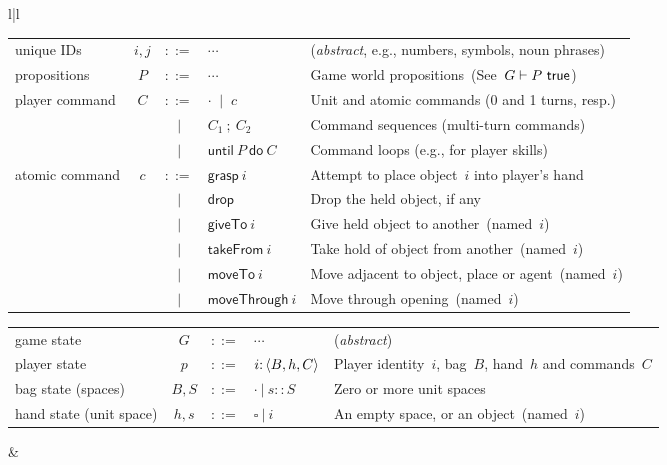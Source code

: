 {\begin{figure*}
\begin{tabular}{l|l}
\begin{minipage}{0.68\textwidth}
\begin{tabular}{lccll}
unique IDs & $i,j$ & $::=$ & $\cdots$ & (\emph{abstract}, e.g., numbers, symbols, noun phrases)
\\
propositions   & $P$ & $::=$ & $\cdots$ & Game world propositions~(See~$G \vdash P~\textsf{true}$)
\\
player command & $C$ & $::=$ & $\cdot$ $~|~$ $c$ & Unit and atomic commands (0 and 1 turns, resp.)
\\
               &     & $~|~$ & $C_1~{;}~C_2$ & Command sequences (multi-turn commands)
\\
               &     & $~|~$ & $\textsf{until}~P~\textsf{do}~C$ & Command loops (e.g., for player skills)
\\
atomic command & $c$ & $::=$ & $\textsf{grasp}~i$ & Attempt to place object~$i$ into player's hand
\\
               &     & $|$   & $\textsf{drop}$ & Drop the held object, if any
\\
               &     & $|$   & $\textsf{giveTo}~i$ & Give held object to another~(named~$i$)
\\
               &     & $|$   & $\textsf{takeFrom}~i$ & Take hold of object from another~(named~$i$)
\\
               &     & $|$   & $\textsf{moveTo}~i$ & Move adjacent to object, place or agent~(named~$i$)
\\
               &     & $|$   & $\textsf{moveThrough}~i$ & Move through opening~(named~$i$)
\\[5mm]
\end{tabular}
\begin{tabular}{lccll}
game state & $G$ & $::=$ & $\cdots$ & (\emph{abstract})
\\
player state & $p$ & $::=$ & ${i}{:}\left<{B},{h},{C}\right>$ & Player identity~$i$, bag~$B$, hand~$h$ and commands~$C$
\\
bag state (spaces) & $B,S$ & $::=$ & $\cdot~|~s::S$ & Zero or more unit spaces
\\
hand state (unit space) & $h,s$ & $::=$ & $\square~|~i$ & An empty space, or an object~(named~$i$)
\\
\end{tabular}
\end{minipage}

&


\end{tabular}
\end{figure*}}

